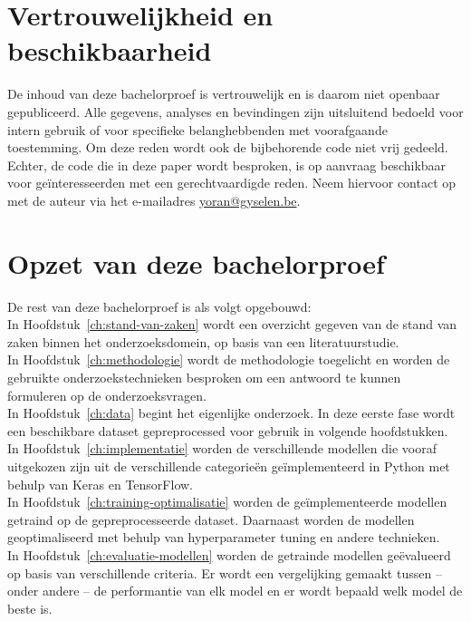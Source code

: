 \section{Vertrouwelijkheid en beschikbaarheid}

De inhoud van deze bachelorproef is vertrouwelijk en is daarom niet openbaar gepubliceerd. Alle gegevens, analyses en bevindingen zijn uitsluitend bedoeld voor intern gebruik of voor specifieke belanghebbenden met voorafgaande toestemming. Om deze reden wordt ook de bijbehorende code niet vrij gedeeld. Echter, de code die in deze paper wordt besproken, is op aanvraag beschikbaar voor geïnteresseerden met een gerechtvaardigde reden. Neem hiervoor contact op met de auteur via het e-mailadres \href{mailto:yoran@gyselen.be}{yoran@gyselen.be}.

\section{Opzet van deze bachelorproef}%
\label{sec:opzet-bachelorproef}

De rest van deze bachelorproef is als volgt opgebouwd: \\

In Hoofdstuk~\ref{ch:stand-van-zaken} wordt een overzicht gegeven van de stand van zaken binnen het onderzoeksdomein, op basis van een literatuurstudie. \\

In Hoofdstuk~\ref{ch:methodologie} wordt de methodologie toegelicht en worden de gebruikte onderzoekstechnieken besproken om een antwoord te kunnen formuleren op de onderzoeksvragen. \\

In Hoofdstuk~\ref{ch:data} begint het eigenlijke onderzoek. In deze eerste fase wordt een beschikbare dataset gepreprocessed voor gebruik in volgende hoofdstukken. \\

In Hoofdstuk~\ref{ch:implementatie} worden de verschillende modellen die vooraf uitgekozen zijn uit de verschillende categorieën geïmplementeerd in Python met behulp van Keras en TensorFlow. \\

In Hoofdstuk~\ref{ch:training-optimalisatie} worden de geïmplementeerde modellen getraind op de gepreprocesseerde dataset. Daarnaast worden de modellen geoptimaliseerd met behulp van hyperparameter tuning en andere technieken. \\

In Hoofdstuk~\ref{ch:evaluatie-modellen} worden de getrainde modellen geëvalueerd op basis van verschillende criteria. Er wordt een vergelijking gemaakt tussen -- onder andere -- de performantie van elk model en er wordt bepaald welk model de beste is. \\

